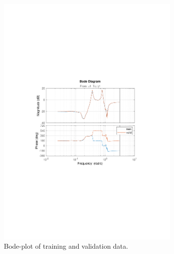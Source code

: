 \documentclass[]{article}
\begin{document}
\begin{figure}[ht]
\centering
\begin{subfigure}{.49\textwidth}
	\centering
	\includegraphics[trim= 10cm 8cm 10cm 8cm, scale=0.4]{figures/bode-train_valid.pdf}
	\caption{Bode-plot of training and validation data.}
	\label{fig:bode-train_valid}
\end{subfigure}
\begin{subfigure}{.49\textwidth}
	\centering

\end{subfigure}
\end{figure}
\end{document}
